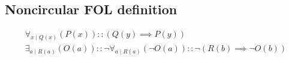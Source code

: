 \documentclass[a4paper]{article}
\makeatletter
\newcommand{\tdb}[1]{\colorbox{lime}{$\displaystyle #1$}}
\newcommand{\cusand}{,}
\newcommand{\cuspop}{.}
\newcommand{\eqComment}[1]{\text{  \# #1}}
\newcommand{\n}{\\[1.5ex] \hline \nonumber \\[0ex]}
\newcommand{\m}{\nonumber \\}
\newcommand\rfrlist[1]{%
    \forcsvlist{\rfrlist@item}{#1}
}
\newcommand\rfrlist@item[1]{\rfr{#1}\\}
\newcommand{\thmlink}[2]{{}_{\substack{\rfrlist{#1}}}^{\dfn{#2}} }
\makeatother
\begin{document}
\begin{comment}
\m \thmlink{THM-LIdm}{THM-LDMr-11} (\rfrOLD{F} \rfrOLD{\lor} \rfrOLD{F} = \rfrOLD{F}) \cusand
\m \thmlink{THM-LDMr-7, THM-LDMr-8, THM-LDMr-9, THM-LDMr-10, THM-LDMr-11}{THM-LDMr-12} ((x \rfrOLD{\lor} y) \rfrOLD{\land} (\rfrOLD{\lnot} x \rfrOLD{\land} \rfrOLD{\lnot} y) = \rfrOLD{F}) \cuspop
\m \thmlink{THM-LDMr-6, THM-LDMr-12, POS-LCmp}{THM-LDMr-13} (((x \rfrOLD{\lor} y) \rfrOLD{\lor} (\rfrOLD{\lnot} x \rfrOLD{\land} \rfrOLD{\lnot} y) = \rfrOLD{T} = (x \rfrOLD{\lor} y) \rfrOLD{\lor} \rfrOLD{\lnot} (x \rfrOLD{\lor} y)) \cusand ((x \rfrOLD{\lor} y) \rfrOLD{\land} (\rfrOLD{\lnot} x \rfrOLD{\land} \rfrOLD{\lnot} y) = \rfrOLD{F} = (x \rfrOLD{\lor} y) \rfrOLD{\land} \rfrOLD{\lnot} (x \rfrOLD{\lor} y))) \cusand
\m \thmlink{THM-LDMr-13, THM-LUNt}{THM-LDMr-14} (\rfrOLD{\lnot} x \rfrOLD{\land} \rfrOLD{\lnot} y = \rfrOLD{\lnot} (x \rfrOLD{\lor} y)) \cusand
\m \thmlink{THM-LDMr-14, THM-Dual}{THM-LDMr} ((\rfrOLD{\lnot} x \rfrOLD{\land} \rfrOLD{\lnot} y = \rfrOLD{\lnot} (x \rfrOLD{\lor} y)) \cusand (\rfrOLD{\lnot} x \rfrOLD{\lor} \rfrOLD{\lnot} y = \rfrOLD{\lnot} (x \rfrOLD{\land} y))) \cuspop
\m \eqComment{Boolean De Morgan's Laws}
\n \thmlink{\implies}{THM-CtrP-1} (x \rfrOLD{\implies} y = (\rfrOLD{\lnot} x) \rfrOLD{\lor} y) \cusand 
\m \thmlink{POS-LCom, THM-LInv}{THM-CtrP-2} ((\rfrOLD{\lnot} x) \rfrOLD{\lor} y = ((\rfrOLD{\lnot} \rfrOLD{\lnot} y) \rfrOLD{\lor} (\rfrOLD{\lnot} x))) \cusand 
\m \thmlink{\implies}{THM-CtrP-3} ((\rfrOLD{\lnot} \rfrOLD{\lnot} y) \rfrOLD{\lor} (\rfrOLD{\lnot} x) = (\rfrOLD{\lnot} y) \rfrOLD{\implies} (\rfrOLD{\lnot} x)) \cusand 
\m \thmlink{THM-CtrP-1, THM-CtrP-2, THM-CtrP-3}{THM-CtrP} (x \rfrOLD{\implies} y = (\rfrOLD{\lnot} y) \rfrOLD{\implies} (\rfrOLD{\lnot} x)) \cuspop
\m \eqComment{Contrapositive Law} 
\n \tdb{(\rfrOLD{T} \rfrOLD{\implies} x = x)}
\n \tdb{(\rfrOLD{F} \rfrOLD{\implies} x = \rfrOLD{T})}
\n \tdb{(x \rfrOLD{\implies} \rfrOLD{T} = \rfrOLD{T})}
\n \tdb{(x \rfrOLD{\implies} \rfrOLD{F} = \rfrOLD{\lnot} x)}  
\n \tdb{((x \rfrOLD{\lor} y) \rfrOLD{\implies} z) = (x \rfrOLD{\implies} z) \rfrOLD{\land} (y \rfrOLD{\implies} z)}
\n \tdb{(x \rfrOLD{\implies} (y \rfrOLD{\land} z) = (x \rfrOLD{\implies} y) \rfrOLD{\land} (x \rfrOLD{\implies} z))} 
\end{align}
\end{tcolorbox}

\end{comment}


\subsection{Noncircular FOL definition}
\begin{tcolorbox}
\begin{align}
   \forall_{x \mid Q(x)} (P(x)) :: (Q(y) \implies P(y))
\m \exists_{a \mid R(a)} (O(a)) :: \lnot \forall_{a \mid R(a)} (\lnot O(a)) :: \lnot (R(b) \implies \lnot O(b)) 
\end{align}
\end{tcolorbox}


%
\end{document}
